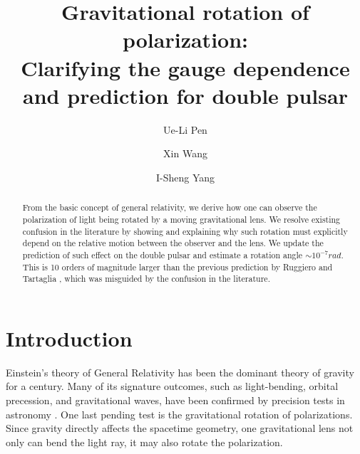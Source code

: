 \documentclass[aps,showpacs,onecolumn,floats,prd,superscriptaddress,nofootinbib]{revtex4}
\begin{document}
\title{Gravitational rotation of polarization: \\ 
Clarifying the gauge dependence and prediction for double pulsar}

\author{Ue-Li Pen}

\author{Xin Wang}

\author{I-Sheng Yang}

\begin{abstract}
From the basic concept of general relativity, we derive how one can observe the polarization of light being rotated by a moving gravitational lens. 
We resolve existing confusion in the literature by showing and explaining why such rotation must explicitly depend on the relative motion between the observer and the lens. 
We update the prediction of such effect on the double pulsar and estimate a rotation angle $\sim 10^{-7}rad$. 
This is 10 orders of magnitude larger than the previous prediction by Ruggiero and Tartaglia \cite{RugTar06}, which was misguided by the confusion in the literature.
\end{abstract}

\maketitle

\section{Introduction}

Einstein's theory of General Relativity has been the dominant theory of gravity for a century. 
Many of its signature outcomes, such as light-bending, orbital precession, and gravitational waves, have been confirmed by precision tests in astronomy \cite{DysEdd20,KraSta97,WeiTay04,Abb16}. 
One last pending test is the gravitational rotation of polarizations. 
Since gravity directly affects the spacetime geometry, one gravitational lens not only can bend the light ray, it may also rotate the polarization.
\end{document}

